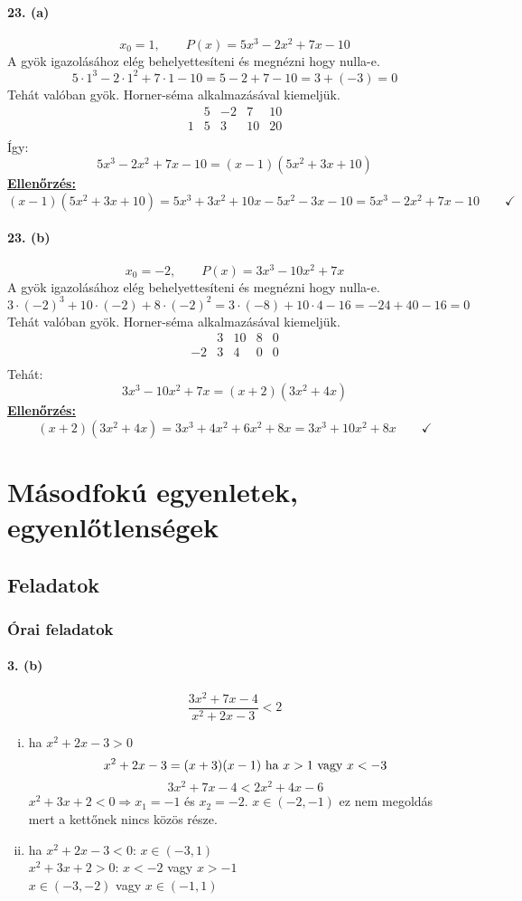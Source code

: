 \documentclass[12pt,a4paper,fleqn]{article}
\newcommand{\myparagraph}[1]{\paragraph{#1}\mbox{}}
\begin{document}
\myparagraph{23. (a)}
\[ x_0 = 1, \qquad P(x) = 5x^3 - 2x^2 + 7x -10 \]
A gyök igazolásához elég behelyettesíteni és megnézni hogy nulla-e.
\[ 5 \cdot 1^3 - 2 \cdot 1^2 + 7 \cdot 1 -10  = 5 - 2 + 7 - 10 = 3 + (-3) = 0 \]
Tehát valóban gyök. Horner-séma alkalmazásával kiemeljük.
\[
  \begin{array}{c|cccc}
    & 5 & -2 &  7 & 10 \\ \hline
  1 &  5 & 3 &  10 & 20 \\
 \end{array}
\]
Így:
\[
  5x^3 - 2x^2 + 7x -10=(x-1)(5x^2+3x+10)
\]
\underline{\textbf{Ellenőrzés:}}
\[
  (x-1)(5x^2+3x+10) = 5x^3 + 3x^2 + 10x - 5x^2 - 3x -10 = 5x^3-2x^2+7x-10
  \qquad \checkmark
\]


\myparagraph{23. (b)}
\[ x_0 = -2, \qquad P(x) = 3x^3 - 10x^2 + 7x \]
A gyök igazolásához elég behelyettesíteni és megnézni hogy nulla-e.
\[
  3 \cdot (-2)^3 + 10 \cdot (-2) + 8 \cdot (-2)^2 = 3 \cdot (-8) + 10 \cdot 4 - 16
    = -24 + 40 - 16 = 0
\]
Tehát valóban gyök. Horner-séma alkalmazásával kiemeljük.
\[
  \begin{array}{c|cccc}
    & 3 & 10 & 8 & 0 \\ \hline
 -2 & 3 & 4  & 0 & 0 \\
 \end{array}
\]
Tehát:
\[
  3x^3 - 10x^2 + 7x=(x+2)(3x^2+4x)
\]
\underline{\textbf{Ellenőrzés:}}
\[
  (x+2)(3x^2+4x)=3x^3+4x^2+6x^2+8x=3x^3+10x^2+8x
  \qquad \checkmark
\]

\section{Másodfokú egyenletek, egyenlőtlenségek}
\setcounter{subsection}{1}
\subsection{Feladatok}
\subsubsection{Órai feladatok}


\myparagraph{3. (b)}
\[ \dfrac{3x^2+7x-4}{x^2+2x-3} < 2 \]
\begin{enumerate}[i.]
  \item ha $x^2+2x-3 > 0$
  \[ x^2+2x-3 = (x+3)(x-1)$ ha $x>1$ vagy $x<-3 \]
  \[ 3x^2+7x-4 < 2x^2+4x-6 \]
  $x^2 + 3x + 2 < 0 \Rightarrow x_1=-1$ és $x_2=-2$. $x \in (-2, -1)$
  ez nem megoldás mert a kettőnek nincs közös része.
  \item ha $x^2+2x-3 < 0$: $x \in (-3, 1)$ \\
  $x^2+3x+2 > 0$: $x<-2$ vagy $x>-1$ \\
  $x \in (-3, -2)$ vagy $x \in (-1, 1)$
\end{enumerate}
\end{document}
